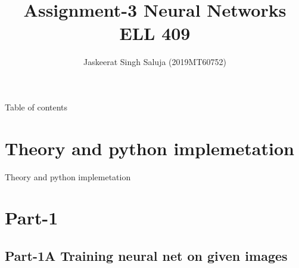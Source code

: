 \documentclass[12pt,t]{beamer}
\author{Jaskeerat Singh Saluja (2019MT60752)}
\title{Assignment-3 Neural Networks \\ ELL 409}
\begin{document}
\begin{frame}[t]
    \titlepage
\end{frame}
    
\begin{frame}[t]{Table of contents}
    \scriptsize
    \tableofcontents
\end{frame}

\section{Theory and python implemetation}
\begin{frame}[t]{Theory and python implemetation }
    
\end{frame}


\section{Part-1}
\subsection{Part-1A Training neural net on given images}
\end{document}
